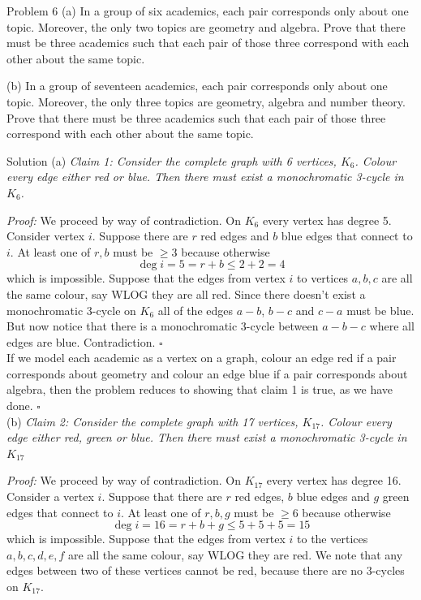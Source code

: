 \documentclass{article}
\begin{document}
\begin{problem}{Problem 6}
(a) In a group of six academics, each pair corresponds only about one topic. Moreover, the only two
topics are geometry and algebra. Prove that there must be three academics such that each pair of
those three correspond with each other about the same topic.
\vspace{0.2cm}

(b) In a group of seventeen academics, each pair corresponds only about one topic. Moreover, the only
three topics are geometry, algebra and number theory. Prove that there must be three academics
such that each pair of those three correspond with each other about the same topic.
\end{problem}

\begin{solution}{Solution}
(a)
\textit{Claim 1: Consider the complete graph with 6 vertices, $K_6$. Colour
every edge either red or blue. Then there must exist a monochromatic
3-cycle in $K_6$.}
\vspace{0.2cm}

\textit{Proof:} We proceed by way of contradiction.
On $K_6$ every vertex has degree 5. Consider vertex $i$.
Suppose there are $r$ red edges and $b$ blue edges that connect to $i$.
At least one of $r,b$ must be $\geq 3$ because otherwise
$$
\deg i = 5 = r+b \leq 2 + 2 = 4
$$
which is impossible. Suppose that the edges from vertex $i$ to
vertices $a,b,c$ are all the same colour, say WLOG they are all red. Since
there doesn't exist a monochromatic 3-cycle on $K_6$ all of the edges
$a - b$, $b - c$ and $c - a$ must be blue. But now notice that
there is a monochromatic 3-cycle between $a - b - c$ where all edges are
blue. Contradiction. $\square$
\\

If we model each academic as a vertex on a graph, colour an edge red
if a pair corresponds about geometry and colour an edge blue if a pair
corresponds about algebra, then the problem reduces to showing that claim 1
is true, as we have done. $\square$
\\

(b) \textit{Claim 2: Consider the complete graph with 17 vertices,
$K_{17}$. Colour every edge either red, green or blue. Then there must
exist a monochromatic 3-cycle in $K_{17}$}
\vspace{0.2cm}

\textit{Proof:} We proceed by way of contradiction. On $K_{17}$ every vertex
has degree 16. Consider a vertex $i$. Suppose that there are
$r$ red edges, $b$ blue edges and $g$ green edges that connect to $i$.
At least one of $r,b,g$ must be $\geq 6$ because otherwise
$$
\deg i = 16 = r + b + g \leq 5 + 5 + 5 = 15
$$
which is impossible. Suppose that the edges from vertex $i$ to the vertices
$a,b,c,d,e,f$ are all the same colour, say WLOG they are red. We note that
any edges between two of these vertices cannot be red, because there are
no 3-cycles on $K_{17}$. \vspace{0.2cm}


\end{solution}
\end{document}
